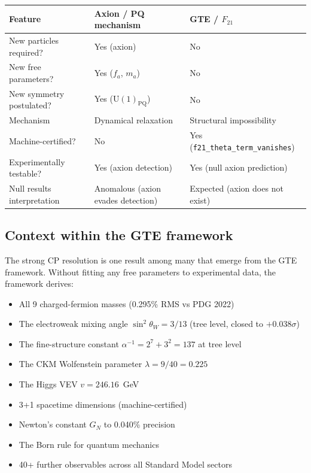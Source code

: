 \documentclass[11pt,a4paper]{article}
\begin{document}
\begin{center}
\begin{tabular}{@{}p{4.2cm}p{4.5cm}p{4.5cm}@{}}
\toprule
Feature & Axion / PQ mechanism & GTE / $F_{21}$ \\
\midrule
New particles required? & Yes (axion) & No \\
New free parameters? & Yes ($f_a$, $m_a$) & No \\
New symmetry postulated? & Yes ($\mathrm{U}(1)_{\mathrm{PQ}}$) & No \\
Mechanism & Dynamical relaxation & Structural impossibility \\
Machine-certified? & No & Yes (\texttt{\small f21\_theta\_term\_vanishes}) \\
Experimentally testable? & Yes (axion detection) & Yes (null axion prediction) \\
Null results interpretation & Anomalous (axion evades detection) & Expected (axion does not exist) \\
\bottomrule
\end{tabular}
\end{center}

\subsection{Context within the GTE framework}

The strong CP resolution is one result among many that emerge from the GTE framework.  Without fitting any free parameters to experimental data, the framework derives:

\begin{itemize}
  \item All 9 charged-fermion masses (0.295\% RMS vs PDG 2022)
  \item The electroweak mixing angle $\sin^2\theta_W = 3/13$ (tree level, closed to $+0.038\sigma$)
  \item The fine-structure constant $\alpha^{-1} = 2^7 + 3^2 = 137$ at tree level
  \item The CKM Wolfenstein parameter $\lambda = 9/40 = 0.225$
  \item The Higgs VEV $v = 246.16$~GeV
  \item 3+1 spacetime dimensions (machine-certified)
  \item Newton's constant $G_N$ to 0.040\% precision
  \item The Born rule for quantum mechanics
  \item 40+ further observables across all Standard Model sectors
\end{itemize}
\end{document}
